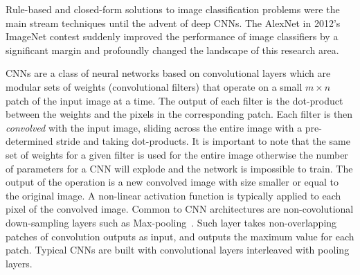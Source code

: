 \label{sec:cnn-cnn}

Rule-based and closed-form solutions to image classification problems were the main stream techniques until the advent of deep CNNs. The AlexNet in 2012's ImageNet contest suddenly improved the performance of image classifiers by a significant margin and profoundly changed the landscape of this research area.

CNNs are a class of neural networks based on convolutional layers which are modular sets of weights (convolutional filters) that operate on a small $m\times n$ patch of the input image at a time. The output of each filter is the dot-product between the weights and the pixels in the corresponding patch. Each filter is then \emph{convolved} with the input image, sliding across the entire image with a pre-determined stride and taking dot-products. It is important to note that the same set of weights for a given filter is used for the entire image otherwise the number of parameters for a CNN will explode and the network is impossible to train. The output of the operation is a new convolved image with size smaller or equal to the original image. A non-linear activation function is typically applied to each pixel of the convolved image.
Common to CNN architectures are non-covolutional down-sampling layers such as Max-pooling~\cite{MAXPOOL}.
Such layer takes non-overlapping patches of convolution outputs as input, and outputs the maximum value for each patch.
Typical CNNs are built with convolutional layers interleaved with pooling layers. 




